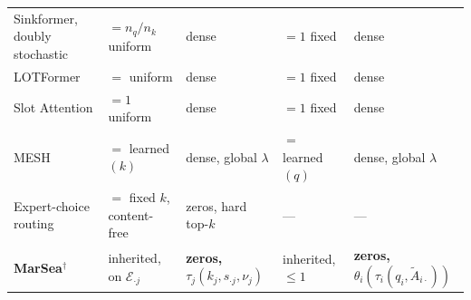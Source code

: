 \documentclass{article}
\begin{document}
\begin{table}[t]
\begin{tabular}{@{}lllll@{}}
Sinkformer, doubly stochastic & $=n_q/n_k$ uniform & dense & $=1$ fixed & dense \\
LOTFormer & $=$ uniform & dense & $=1$ fixed & dense \\
Slot Attention & $=1$ uniform & dense & $=1$ fixed & dense \\
MESH & $=$ learned$(k)$ & dense, global $\lambda$ & $=$ learned$(q)$ & dense, global $\lambda$ \\
Expert-choice routing & $=$ fixed $k$, content-free & zeros, hard top-$k$ & --- & --- \\
\midrule
\textbf{MarSea}$^{\dagger}$ & inherited, on $\mathcal{E}_{\cdot j}$ & \textbf{zeros,}
$\tau_j(k_j,s_{\cdot j},\nu_j)$ & inherited, $\le 1$ & \textbf{zeros,}
$\theta_i(\tau_i(q_i,\tilde A_{i\cdot}))$ \\
\bottomrule
\end{tabular}
\end{table}
\end{document}
